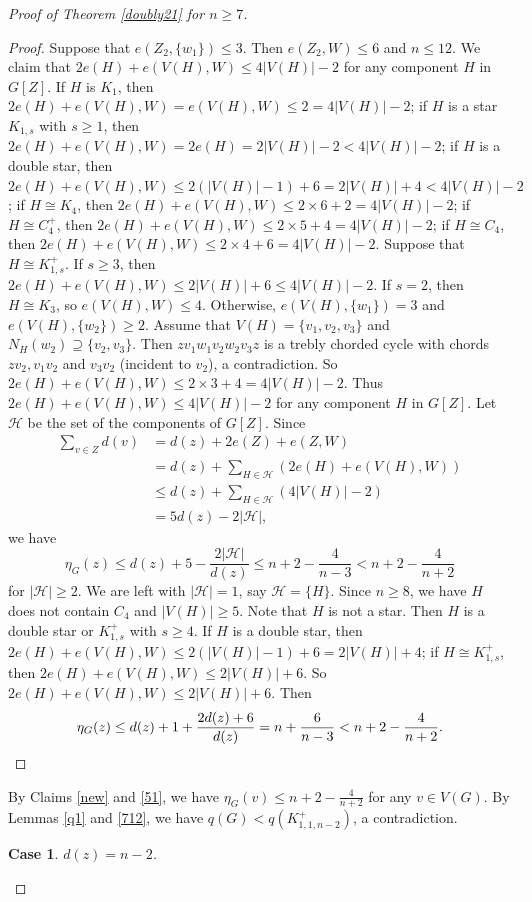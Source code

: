 \documentclass[12pt]{article}
\newtheorem {case}{Case}
\begin{document}
\begin{proof}[Proof of Theorem \ref{doubly21} for $n\ge 7$]
\begin{proof}
Suppose that $e(Z_2,\{w_1\})\le 3$. Then $e(Z_2,W)\le 6$ and $n\le 12$. We claim that $2e(H)+e(V(H),W)\le 4|V(H)|-2$ for any component $H$ in $G[Z]$.
If $H$ is $K_1$, then $2e(H)+e(V(H),W)=e(V(H),W)\le 2= 4|V(H)|-2$;
if $H$ is a star $K_{1,s}$ with $s\ge 1$, then $2e(H)+e(V(H),W)=2e(H)= 2|V(H)|-2<4|V(H)|-2$;
if $H$ is a double star, then $2e(H)+e(V(H),W)\le 2(|V(H)|-1)+6=2|V(H)|+4<4|V(H)|-2$;
if $H\cong K_4$, then $2e(H)+e(V(H),W)\le 2\times 6+2=4|V(H)|-2$;
if $H\cong C_4^+$, then $2e(H)+e(V(H),W)\le 2\times 5+4=4|V(H)|-2$;
if $H\cong C_4$, then $2e(H)+e(V(H),W)\le 2\times 4+6=4|V(H)|-2$.
Suppose that $H\cong K_{1,s}^+$.  If $s\ge 3$, then $2e(H)+e(V(H),W)\le 2|V(H)|+6\le 4|V(H)|-2$.
If $s=2$, then $H\cong K_3$, so $e(V(H),W)\le 4$. Otherwise,  $e(V(H),\{w_1\})=3$ and $e(V(H),\{w_2\})\ge 2$.
Assume that $V(H)=\{v_1,v_2,v_3\}$ and $N_{H}(w_2)\supseteq \{v_2,v_3\}$. Then $zv_1w_1v_2w_2v_3z$ is a trebly chorded cycle with  chords $zv_2, v_1v_2$ and $v_3v_2$ (incident to $v_2$), a contradiction.
So $2e(H)+e(V(H),W)\le 2\times 3+4=4|V(H)|-2$.
Thus  $2e(H)+e(V(H),W)\le 4|V(H)|-2$ for any component $H$ in $G[Z]$.
Let $\mathcal{H}$ be the set of the components of $G[Z]$.
Since
\begin{align*}
\sum_{v\in Z}d(v)&=d(z)+2e(Z)+e(Z,W)\\
&=d(z)+\sum_{H\in \mathcal{H}}(2e(H)+e(V(H),W))\\
&\le d(z)+\sum_{H\in \mathcal{H}}(4|V(H)|-2)\\
&=5d(z)-2|\mathcal{H}|,
\end{align*}
we have
\[
\eta_G(z)\le d(z)+5-\frac{2|\mathcal{H}|}{d(z)}\le n+2-\frac{4}{n-3}<n+2-\frac{4}{n+2}
\]
for $|\mathcal{H}|\ge 2$.
We are left with $|\mathcal{H}|=1$, say $\mathcal{H}=\{H\}$.
Since $n\ge 8$, we have $H$ does not contain $C_4$ and $|V(H)|\ge 5$.
Note that  $H$ is not a star.  Then $H$ is a double star or $K_{1,s}^+$ with $s\ge 4$.
If $H$ is a double star, then $2e(H)+e(V(H),W)\le 2(|V(H)|-1)+6=2|V(H)|+4$;
if $H\cong K_{1,s}^+$, then $2e(H)+e(V(H),W)\le 2|V(H)|+6$.
So $2e(H)+e(V(H),W)\le 2|V(H)|+6$.
Then
\[
\eta_G(z)\le d(z)+1+\frac{2d(z)+6}{d(z)}=n+\frac{6}{n-3}<n+2-\frac{4}{n+2}. \qedhere
\]
\end{proof}



By Claims \ref{new} and \ref{51}, we have $\eta_{G}(v)\le n+2-\frac{4}{n+2}$ for any $v\in V(G)$.
By Lemmas \ref{q1} and \ref{712}, we have $q(G)<q(K_{1,1,n-2}^+)$, a contradiction.



\begin{case}\label{a1}
$d(z)=n-2$.
\end{case}


\end{proof}
\end{document}
